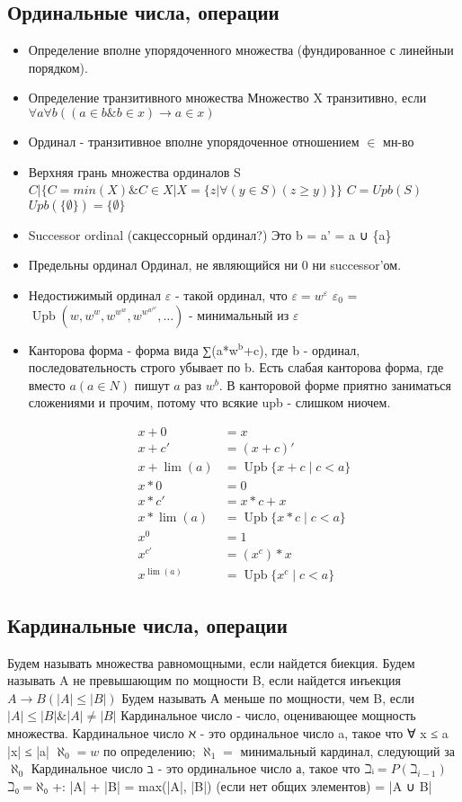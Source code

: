 \documentclass[12pt]{article}
\renewcommand{\epsilon}{\varepsilon}
\begin{document}
\subsection{Ординальные числа, операции}
\label{sec-2-41}
\begin{itemize}
\item Определение вполне упорядоченного множества (фундированное
с линейныи порядком).
\item Определение транзитивного множества
Множество X транзитивно, если
$∀a∀b((a \in b \& b \in x) \to a \in x)$
\item Ординал - транзитивное вполне упорядоченное отношением $\in$ мн-во
\item Верхняя грань множества ординалов S
$C | \{C = min(X) \& C \in X | X = \{z | ∀(y\in S)(z ≥ y)\}\}$
$C = Upb(S)$
$Upb(\{∅\}) = \{∅\}$
\item Successor ordinal (сакцессорный ординал?)
Это b = a' = a ∪ \{a\}
\item Предельны ординал
Ординал, не являющийся ни 0 ни successor'ом.
\item Недостижимый ординал
$\epsilon$ - такой ординал, что $\epsilon  = w^\epsilon $
$\epsilon_0$ = $\operatorname{Upb}(w, w^w, w^{w^w}, w^{w^{w^w}}, \dotsc)$ - минимальный из $\epsilon$
\item Канторова форма - форма вида ∑(a*w$^{\text{b}}$+c), где b - ординал, последовательность
строго убывает по b. Есть слабая канторова форма, где вместо $a (a \in N)$
пишут $a$ раз $w^b$. В канторовой форме приятно заниматься сложениями и
прочим, потому что всякие upb - слишком ниочем.

\begin{align*}
x + 0      &= x \\
x + c'     &= (x + c)' \\
x + \lim(a) &= \operatorname{Upb}\{x + c \mid c < a\} \\
x * 0      &= 0 \\
x * c'     &= x * c + x \\
x * \lim(a) &= \operatorname{Upb}\{x * c \mid c < a\} \\
x ^ 0      &= 1 \\
x ^ {c'}     &= (x ^ c) * x \\
x ^ {\lim(a)} &= \operatorname{Upb}\{x ^ c \mid c < a\}
\end{align*}
\end{itemize}
\subsection{Кардинальные числа, операции}
\label{sec-2-42}
Будем называть множества равномощными, если найдется биекция.
Будем называть A не превышающим по мощности B, если найдется
инъекция $A \to B (|A| ≤ |B|)$
Будем называть А меньше по мощности, чем B, если $|A| ≤ |B| \& |A| \ne  |B|$
Кардинальное число - число, оценивающее мощность множества.
Кардинальное число ℵ - это ординальное число a, такое что
∀ x ≤ a |x| ≤ |a|
$\aleph_0 = w$ по определению; $\aleph_1 = {}$ минимальный кардинал, следующий за $\aleph_0$
Кардинальное число ℶ - это ординальное число а, такое что
$ℶᵢ = P(ℶ_{i-1})$
$ℶ₀ = ℵ₀$
+: |A| + |B| = max(|A|, |B|) (если нет общих элементов) = |A ∪ B|
\end{document}
